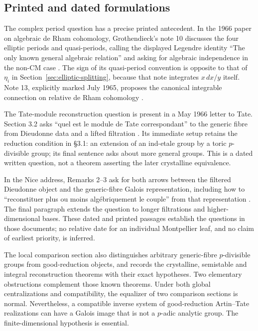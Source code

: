 \documentclass[11pt]{article}
\theoremstyle{definition}\newtheorem{definition}[theorem]{Definition}
\theoremstyle{remark}\newtheorem{remark}[theorem]{Remark}
\begin{document}
\subsection*{Printed and dated formulations}
The complex period question has a precise printed antecedent. In the 1966 paper on algebraic de Rham cohomology, Grothendieck's note 10 discusses the four elliptic periods and quasi-periods, calling the displayed Legendre identity ``The only known general algebraic relation'' and asking for algebraic independence in the non-CM case \cite[note 10, p.~102; PDF p.~9]{GrothendieckDeRham}. The sign of its quasi-period convention is opposite to that of $\eta_i$ in Section~\ref{sec:elliptic-splitting}, because that note integrates $x\,dx/y$ itself. Note 13, explicitly marked July 1965, proposes the canonical integrable connection on relative de Rham cohomology \cite[p.~103; PDF p.~10]{GrothendieckDeRham}.

The Tate-module reconstruction question is present in a May 1966 letter to Tate. Section 3.2 asks ``quel est le module de Tate correspondant'' to the generic fibre from Dieudonne data and a lifted filtration \cite[p.~30, \S3.2]{GrothendieckTateLetter}. Its immediate setup retains the reduction condition in \S3.1: an extension of an ind-etale group by a toric $p$-divisible group; its final sentence asks about more general groups. This is a dated written question, not a theorem asserting the later crystalline equivalence.

In the Nice address, Remarks 2--3 ask for both arrows between the filtered Dieudonne object and the generic-fibre Galois representation, including how to ``reconstituer plus ou moins alg\'ebriquement le couple'' from that representation \cite[p.~435; PDF p.~5]{GrothendieckNice}. The final paragraph extends the question to longer filtrations and higher-dimensional bases. These dated and printed passages establish the questions in those documents; no relative date for an individual Montpellier leaf, and no claim of earliest priority, is inferred.

The local comparison section also distinguishes arbitrary generic-fibre $p$-divisible groups from good-reduction objects, and records the crystalline, semistable and integral reconstruction theorems with their exact hypotheses. Two elementary obstructions complement those known theorems. Under both global centralizations and compatibility, the equalizer of two comparison sections is normal. Nevertheless, a compatible inverse system of good-reduction Artin--Tate realizations can have a Galois image that is not a $p$-adic analytic group. The finite-dimensional hypothesis is essential.
\end{document}

